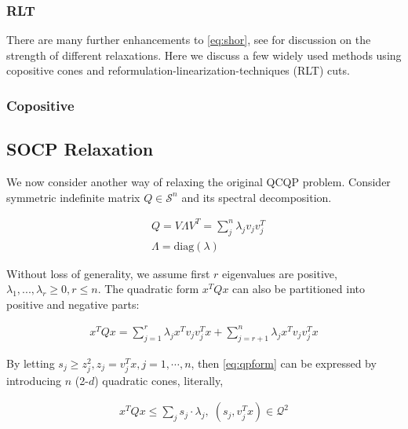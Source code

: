 \documentclass[../main]{subfiles}
\begin{document}
\subsubsection{RLT}
There are many further enhancements to \eqref{eq:shor}, see \cite{bao_semidefinite_2011} for discussion on the strength of different relaxations. Here we discuss a few widely used methods using copositive cones and reformulation-linearization-techniques (RLT) cuts.
\subsubsection{Copositive}

\subsection{SOCP Relaxation}

We now consider another way of relaxing the original QCQP problem. Consider symmetric indefinite matrix \(Q \in \mathcal{S}^n\) and its spectral decomposition.

\begin{equation}
  \begin{aligned}
     & Q = V\Lambda V ^T =\sum_j^n \lambda_j v_j  v_j^T \\
     & \Lambda = \mathrm{diag}(\lambda)
  \end{aligned}
\end{equation}

Without loss of generality, we assume first \(r\) eigenvalues are positive, \(\lambda_1, ..., \lambda_r \ge 0, r\le n \). The quadratic form \(x^TQx\) can also be partitioned into positive and negative parts:

\begin{equation}\label{eq:qpform}
  \begin{aligned}
    x^TQx = \sum_{j=1}^r \lambda_j x^T v_j v_j^T x + \sum_{j=r+1}^n \lambda_j x^T v_j v_j^T x
  \end{aligned}
\end{equation}

By letting \(s_j \ge z_j^2, z_j = v_j^T x, j = 1, \cdots, n\), then \eqref{eq:qpform} can be expressed by introducing \(n\) (2-\(d\)) quadratic cones, literally,

\begin{equation}
  \begin{aligned}
    x^TQx \le \sum_j s_j \cdot \lambda_j,\; (s_j, v^T_j x) \in \mathcal{Q}^2
  \end{aligned}
\end{equation}
\end{document}

